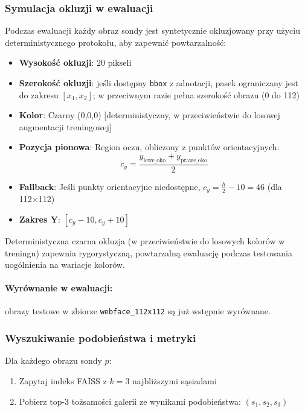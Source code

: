 \subsubsection{Symulacja okluzji w ewaluacji}
\label{subsubsec:eval_occlusion}

Podczas ewaluacji każdy obraz sondy jest syntetycznie okluzjowany przy użyciu deterministycznego protokołu, aby zapewnić powtarzalność:

\begin{itemize}
    \item \textbf{Wysokość okluzji}: 20 pikseli
    \item \textbf{Szerokość okluzji}: jeśli dostępny \texttt{bbox} z adnotacji, pasek ograniczany jest do zakresu $[x_1, x_2]$; w przeciwnym razie pełna szerokość obrazu (0 do 112)
    \item \textbf{Kolor}: Czarny (0,0,0) [deterministyczny, w przeciwieństwie do losowej augmentacji treningowej]
    \item \textbf{Pozycja pionowa}: Region oczu, obliczony z punktów orientacyjnych:
    \begin{equation}
    c_y = \frac{y_{\text{lewe\_oko}} + y_{\text{prawe\_oko}}}{2}
    \end{equation}
    \item \textbf{Fallback}: Jeśli punkty orientacyjne niedostępne, $c_y = \frac{h}{2} - 10 = 46$ (dla 112×112)
    \item \textbf{Zakres Y}: $[c_y - 10, c_y + 10]$
\end{itemize}

Deterministyczna czarna okluzja (w przeciwieństwie do losowych kolorów w treningu) zapewnia rygorystyczną, powtarzalną ewaluację podczas testowania uogólnienia na wariacje kolorów.

\paragraph{Wyrównanie w ewaluacji:} obrazy testowe w zbiorze \texttt{webface\_112x112} są już wstępnie wyrównane.

\subsubsection{Wyszukiwanie podobieństwa i metryki}
Dla każdego obrazu sondy $p$:
\begin{enumerate}
    \item Zapytaj indeks FAISS z $k=3$ najbliższymi sąsiadami
    \item Pobierz top-3 tożsamości galerii ze wynikami podobieństwa: $(s_1, s_2, s_3)$
\end{enumerate}

